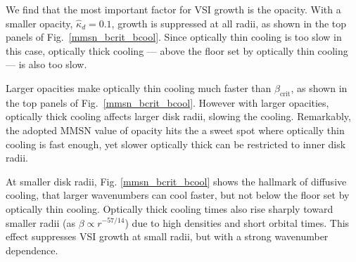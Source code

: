 We find that the most important factor for VSI growth is the opacity.
With a smaller opacity, $\hat{\kappa}_d = 0.1$, growth is suppressed
at all radii, as shown in the top panels of Fig.\
\ref{mmsn_bcrit_bcool}.  Since optically thin cooling is too slow in
this case, optically thick cooling --- above the floor set by optically
thin cooling --- is also too slow.   

Larger opacities make optically thin cooling much faster than $\beta_\mathrm{crit}$, as shown in the top panels of Fig.\ \ref{mmsn_bcrit_bcool}.  However with larger opacities, optically thick cooling affects larger disk radii, slowing the cooling.  Remarkably, the adopted MMSN value of opacity hits the a sweet spot where optically thin cooling is fast enough, yet slower optically thick can be restricted to inner disk radii.

At smaller disk radii,  Fig. \ref{mmsn_bcrit_bcool} shows the hallmark of diffusive cooling, that larger wavenumbers can cool faster, but not below the floor set by optically thin cooling.  Optically thick cooling times also rise sharply toward smaller radii (as $\beta \propto r^{-57/14}$) due to high densities and short orbital times.  This effect suppresses VSI growth at small radii, but with a strong wavenumber dependence. 



